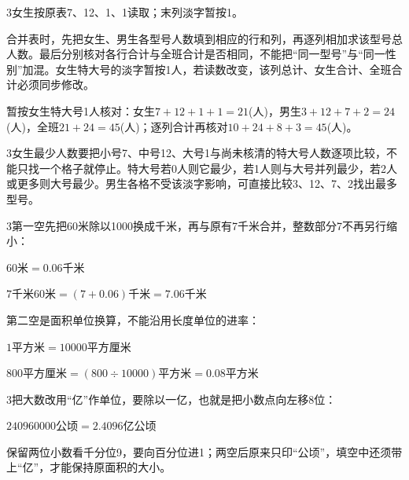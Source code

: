 \documentclass[multi=snippet,border={5bp 20bp 5bp 5bp}]{standalone}
\newenvironment{snippet}[3]{\begin{minipage}{#1bp}\color{answerred}\fontsize{#2}{#3}\selectfont\raggedright}{\end{minipage}}
\begin{document}
\begin{snippet}{505}{11.5}{14}\begin{multicols}{3}\raggedcolumns 女生按原表7、12、1、1读取；末列淡字暂按1。\par 合并表时，先把女生、男生各型号人数填到相应的行和列，再逐列相加求该型号总人数。最后分别核对各行合计与全班合计是否相同，不能把“同一型号”与“同一性别”加混。女生特大号的淡字暂按1人，若读数改变，该列总计、女生合计、全班合计必须同步修改。\par 暂按女生特大号1人核对：女生\(7+12+1+1=21\)\allowbreak (人)，男生\(3+12+7+2=24\)\allowbreak (人)，全班\(21+24=45\)\allowbreak (人)；逐列合计再核对\(10+24+8+3=45\)\allowbreak (人)。\end{multicols}\end{snippet}
\begin{snippet}{505}{11.5}{14}\begin{multicols}{3}\raggedcolumns 女生最少人数要把小号7、中号12、大号1与尚未核清的特大号人数逐项比较，不能只找一个格子就停止。特大号若0人则它最少，若1人则与大号并列最少，若2人或更多则大号最少。男生各格不受该淡字影响，可直接比较3、12、7、2找出最多型号。\end{multicols}\end{snippet}
\begin{snippet}{505}{11.5}{14}\begin{multicols}{3}\raggedcolumns 第一空先把60米除以1000换成千米，再与原有7千米合并，整数部分7不再另行缩小：\par\noindent\(\displaystyle 60\text{米}=0.06\text{千米}\)\allowbreak \par \noindent\(\displaystyle 7\text{千米}60\text{米}=(7+0.06)\text{千米}=7.06\text{千米}\)\allowbreak \par 第二空是面积单位换算，不能沿用长度单位的进率：\par\noindent\(\displaystyle 1\text{平方米}=10000\text{平方厘米}\)\allowbreak \par \noindent\(\displaystyle 800\text{平方厘米}=(800\div10000)\text{平方米}=0.08\text{平方米}\)\allowbreak \par\end{multicols}\end{snippet}
\begin{snippet}{505}{11.5}{14}\begin{multicols}{3}\raggedcolumns 把大数改用“亿”作单位，要除以一亿，也就是把小数点向左移8位：\par\noindent\(\displaystyle 240960000\text{公顷}=2.4096\text{亿公顷}\)\allowbreak \par 保留两位小数看千分位9，要向百分位进1；两空后原来只印“公顷”，填空中还须带上“亿”，才能保持原面积的大小。\end{multicols}\end{snippet}
\end{document}
